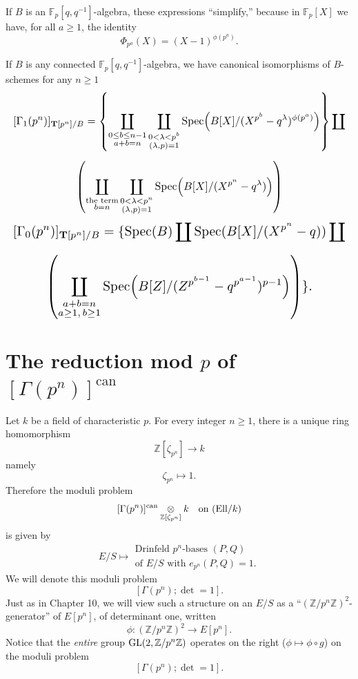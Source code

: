 If $B$ is an $\mathbb{F}_p[q,q^{-1}]$-algebra, these expressions ``simplify,'' because in $\mathbb{F}_p[X]$ we have, for all $a \ge 1$, the identity
\[
\Phi_{p^a}(X) = (X-1)^{\phi(p^a)} .
\]

\begin{kthm}\label{thm:13.6.7}
If $B$ is any connected $\mathbb{F}_p[q,q^{-1}]$-algebra, we have canonical isomorphisms of $B$-schemes for any $n \ge 1$
\[
\resizebox{\linewidth}{!}{$\displaystyle
\begin{gathered}
[\Gamma_1(p^n)]_{\mathbf{T}[p^n]/B} = \left\{ \coprod_{\substack{0 \le b \le n-1 \\ a+b=n}} \coprod_{\substack{0 < \lambda < p^b \\ (\lambda,p)=1}} \Spec\!\left(B[X]/(X^{p^b}-q^\lambda)^{\phi(p^a)}\right) \right\} \coprod \\[5pt]
\left( \coprod_{\substack{\text{the term} \\ b = n}} \coprod_{\substack{0 < \lambda < p^n \\ (\lambda,p)=1}} \Spec\!\left(B[X]/(X^{p^n}-q^\lambda)\right) \right)
\end{gathered}$}
\]
\[
\resizebox{\linewidth}{!}{$\displaystyle
\begin{gathered}
[\Gamma_0(p^n)]_{\mathbf{T}[p^n]/B} = \{ \Spec(B) \coprod \Spec(B[X]/(X^{p^n}-q)) \coprod \\[5pt]
\left( \coprod_{\substack{a+b=n \\ a \ge 1,\, b \ge 1}} \Spec\!\left(B[Z]/(Z^{p^{b-1}}-q^{p^{a-1}})^{p-1}\right) \right) \} .
\end{gathered}$}
\]
\end{kthm}

\section[The reduction mod {$p$} of {$[\Gamma(p^n)]^{\mathrm{can}}$}]{The reduction mod $p$ of \texorpdfstring{$[\Gamma(p^n)]^{\mathrm{can}}$}{[Gamma(p^n)]^can}}
\label{sec:13.7}

\kmitem\label{item:13.7.1}Let $k$ be a field of characteristic $p$. For every integer $n \ge 1$, there is a unique ring homomorphism
\[
\mathbb{Z}[\zeta_{p^n}] \to k
\]
namely
\[
\zeta_{p^n} \mapsto 1 .
\]
Therefore the moduli problem
\[
[\Gamma(p^n)]^{\mathrm{can}} \underset{\mathbb{Z}[\zeta_{p^n}]}{\otimes} k \quad \text{on } (\mathrm{Ell}/k)
\]
is given by
\[
E/S \mapsto \begin{array}{l}
\text{Drinfeld } p^n\text{-bases } (P,Q) \\
\text{of } E/S \text{ with } e_{p^n}(P,Q) = 1 .
\end{array}
\]
We will denote this moduli problem
\[
[\Gamma(p^n); \det = 1] .
\]
Just as in Chapter 10, we will view such a structure on an $E/S$ as a ``$(\mathbb{Z}/p^n\mathbb{Z})^2$-generator'' of $E[p^n]$, of determinant one, written
\[
\phi : (\mathbb{Z}/p^n\mathbb{Z})^2 \to E[p^n] .
\]
Notice that the \emph{entire} group $\operatorname{GL}(2,\mathbb{Z}/p^n\mathbb{Z})$ operates on the right ($\phi \mapsto \phi \circ g$) on the moduli problem
\[
[\Gamma(p^n); \det = 1] .
\]

